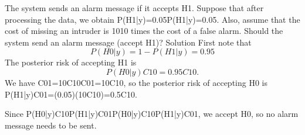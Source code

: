 \documentclass[]{report}
\begin{document}


The system sends an alarm message if it accepts H1. Suppose that after processing the data, we obtain P(H1|y)=0.05P(H1|y)=0.05. Also, assume that the cost of missing an intruder is 1010 times the cost of a false alarm. Should the system send an alarm message (accept H1)?
Solution
First note that
\[P(H0|y)=1−P(H1|y)=0.95\]
The posterior risk of accepting H1 is
\[P(H0|y)C10=0.95C10.\]
We have C01=10C10C01=10C10, so the posterior risk of accepting H0 is
P(H1|y)C01=(0.05)(10C10)=0.5C10.

Since P(H0|y)C10\geq P(H1|y)C01P(H0|y)C10\geq P(H1|y)C01, we accept H0, so no alarm message needs to be sent.
\end{document}

